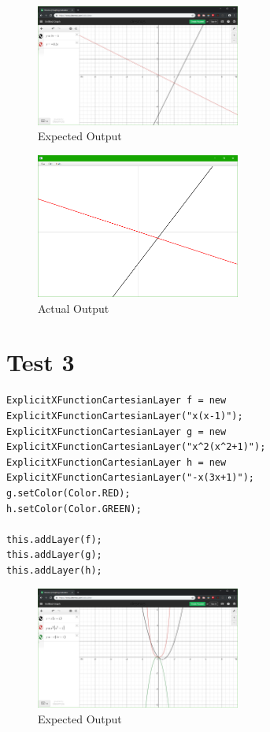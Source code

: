 \documentclass[../../../main.tex]{subfiles}
\begin{document}
\begin{figure}[H]
	\centering
	\includegraphics[width=0.6\textwidth]{tests/expected2}
	\caption{Expected Output}
\end{figure}

\begin{figure}[H]
	\centering
	\includegraphics[width=0.6\textwidth]{tests/actual2}
	\caption{Actual Output}
\end{figure}
\newpage

\section{Test 3}
\begin{verbatim}
ExplicitXFunctionCartesianLayer f = new ExplicitXFunctionCartesianLayer("x(x-1)");
ExplicitXFunctionCartesianLayer g = new ExplicitXFunctionCartesianLayer("x^2(x^2+1)");
ExplicitXFunctionCartesianLayer h = new ExplicitXFunctionCartesianLayer("-x(3x+1)");
g.setColor(Color.RED);
h.setColor(Color.GREEN);

this.addLayer(f);
this.addLayer(g);
this.addLayer(h);
\end{verbatim}

\begin{figure}[H]
	\centering
	\includegraphics[width=0.6\textwidth]{tests/expected3}
	\caption{Expected Output}
\end{figure}
\end{document}
